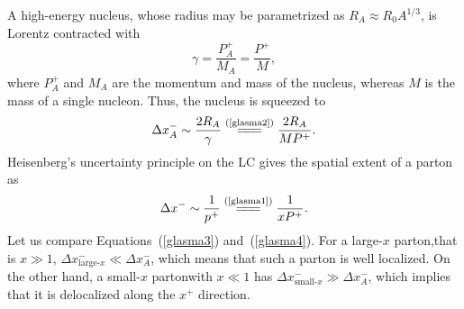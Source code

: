 \begin{note}
    A high-energy nucleus, whose radius may be parametrized as $R_A\approx R_0A^{1/3}$, is Lorentz contracted with
    \begin{equation}\label{glasma2}
        \gamma=\frac{P^+_A}{M_A}=\frac{P^+}{M},
    \end{equation}
    where $P^+_A$ and $M_A$ are the momentum and mass of the nucleus, whereas $M$ is the mass of a single nucleon. Thus, the nucleus is squeezed to
    \begin{equation}\label{glasma3}
        \Delta x^-_A\sim\frac{2R_A}{\gamma}\stackrel{(\text{\cref{glasma2}})}{=\joinrel=\joinrel=}\frac{2R_A}{MP^+}.
    \end{equation}
    Heisenberg's uncertainty principle on the {\sffamily LC} gives the spatial extent of a parton as
    \begin{equation}\label{glasma4}
        \Delta x^-\sim\frac{1}{p^+}\stackrel{(\text{\cref{glasma1}})}{=\joinrel=\joinrel=}\frac{1}{xP^+}.
    \end{equation}
    Let us compare Equations~(\cref{glasma3}) and~(\cref{glasma4}). For a large-$x$ parton,that is $x\gg 1$, $\Delta x^-_{\text{large-}x}\ll \Delta x^-_A$, which means that such a parton is {\sffamily\color{ming}well localized}. On the other hand, a small-$x$ partonwith $x\ll 1$ has $\Delta x^-_{\text{small-}x}\gg \Delta x^-_A$, which implies that it is {\sffamily\color{ming}delocalized} along the $x^+$ direction. 
\end{note}

